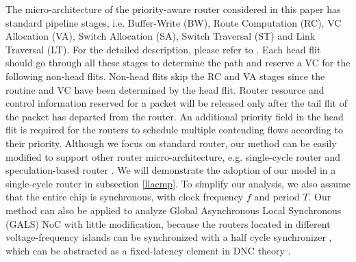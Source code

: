 \documentclass[preprint]{elsarticle}
\begin{document}
The micro-architecture of the priority-aware router considered in this paper has standard pipeline stages, i.e. Buffer-Write (BW), Route Computation (RC), VC Allocation (VA), Switch Allocation (SA), Switch Traversal (ST) and Link Traversal (LT). For the detailed description, please refer to \cite{jerger2009chip}. Each head flit should go through all these stages to determine the path and reserve a VC for the following non-head flits. Non-head flits skip the RC and VA stages since the routine and VC have been determined by the head flit. Router resource and control information reserved for a packet will be released only after the tail flit of the packet has departed from the router. An additional priority field in the head flit is required for the routers to schedule multiple contending flows according to their priority. Although we focus on standard router, our method can be easily modified to support other router micro-architecture, e.g. single-cycle router \cite{189,Shi:2008:RCA:1397757.1397996,73} and speculation-based router \cite{jerger2009chip}. We will demonstrate the adoption of our model in a single-cycle router in subsection \ref{llacmp}.  To simplify our analysis, we also assume that the entire chip is synchronous, with clock frequency $f$ and period $T$. Our method can also be applied to analyze Global Asynchronous Local Synchronous (GALS) NoC with little modification, because the routers located in different voltage-frequency islands can be synchronized with a half cycle synchronizer \cite{5476986}, which can be abstracted as a fixed-latency element in DNC theory \cite{Boudec2001Network}.
\end{document}
